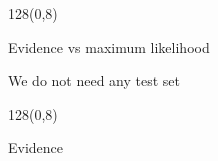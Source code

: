 \documentclass[shownotes]{beamer}
\begin{document}
\begin{frame}
\begin{textblock}{128}(0,8)
\begin{center}
 \large Evidence vs maximum likelihood
\end{center}
\end{textblock}
\vspace{1cm}

\begin{mdframed}[backgroundcolor=black!15]
\centering \Large
We do not need any test set
\end{mdframed}

\end{frame}

\begin{frame}
\begin{textblock}{128}(0,8)
\begin{center}
 \large Evidence 
\end{center}
\end{textblock}
\vspace{1cm}
 
 
\end{frame}
\end{document}

